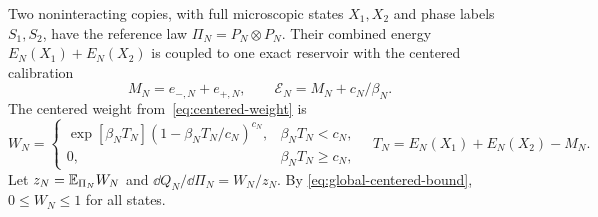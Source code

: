 Two noninteracting copies, with full microscopic states $X_1,X_2$
and phase labels $S_1,S_2$, have the reference law
$\Pi_N=P_N\otimes P_N$. Their combined energy $E_N(X_1)+E_N(X_2)$ is
coupled to one exact reservoir with the centered calibration
\begin{equation}
 M_N=e_{-,N}+e_{+,N},\qquad
 \mathcal E_N=M_N+c_N/\beta_N.
 \label{eq:shared-centered-energy}
\end{equation}
The centered weight from~\eqref{eq:centered-weight} is
\begin{equation}
 W_N=
 \begin{cases}
 \exp[\beta_N T_N]
       (1-\beta_N T_N/c_N)^{c_N},&\beta_N T_N<c_N,\\
 0,&\beta_N T_N\ge c_N,
 \end{cases}
 \quad
 T_N=E_N(X_1)+E_N(X_2)-M_N.
 \label{eq:shared-weight}
\end{equation}
Let $z_N=\mathbb E_{\Pi_N}W_N$ and $\dd Q_N/\dd\Pi_N=W_N/z_N$. By
\eqref{eq:global-centered-bound}, $0\le W_N\le1$ for all states.

